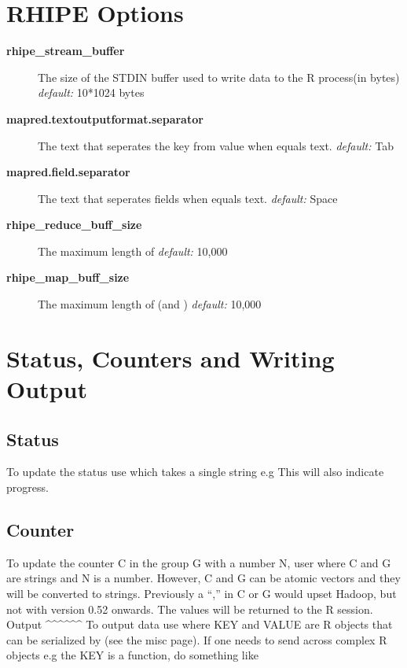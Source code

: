 \documentclass[letterpaper,10pt,english]{manual}
\begin{document}
\section{RHIPE Options}
\begin{description}
\item[\textbf{rhipe\_stream\_buffer}]
The size of the STDIN buffer used to write data to the R process(in bytes)
\emph{default:} 10*1024 bytes

\item[\textbf{mapred.textoutputformat.separator}]
The text that seperates the key from value when  equals text.
\emph{default:} Tab

\item[\textbf{mapred.field.separator}]
The text that seperates fields when  equals text.
\emph{default:} Space

\item[\textbf{rhipe\_reduce\_buff\_size}]
The maximum length of 
\emph{default:} 10,000

\item[\textbf{rhipe\_map\_buff\_size}]
The maximum length of  (and )
\emph{default:} 10,000

\end{description}


\section{Status, Counters and Writing Output}


\subsection{Status}

To update the status use  which takes a single string e.g 
This will also indicate progress.


\subsection{Counter}

To update the counter C in the group G with a number N, user 
where C and G are strings and N is a number. However, C and G can be atomic vectors and they will be converted to strings.
Previously a ``,'' in C or G would upset Hadoop, but not with version 0.52 onwards.
The values will be returned to the R session.
Output
\textasciicircum{}\textasciicircum{}\textasciicircum{}\textasciicircum{}\textasciicircum{}\textasciicircum{}
To output data use  where KEY and VALUE are R objects that can be serialized by  (see the misc page). If one needs to send across complex R objects e.g the KEY is a function, do something like 
\end{document}
